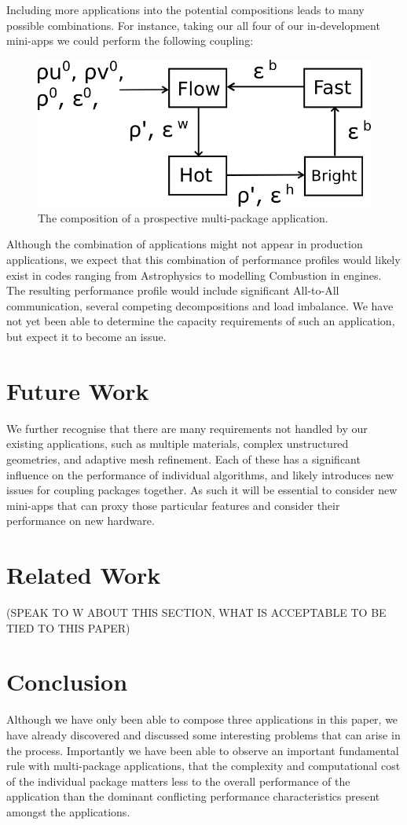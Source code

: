 \documentclass[runningheads,a4paper]{llncs}
\begin{document}
Including more applications into the potential compositions leads to many possible combinations. For instance, taking our all four of our in-development mini-apps we could perform the following coupling:

\begin{figure}
  \centering
  \includegraphics[width=0.6\linewidth]{all-four-flow}
  \caption{The composition of a prospective multi-package application.}
  \label{fig:multi-package-flow}
\end{figure}

Although the combination of applications might not appear in production applications, we expect that this combination of performance profiles would likely exist in codes ranging from Astrophysics to modelling Combustion in engines. The resulting performance profile would include significant All-to-All communication, several competing decompositions and load imbalance. We have not yet been able to determine the capacity requirements of such an application, but expect it to become an issue.

\section{Future Work}

We further recognise that there are many requirements not handled by our existing applications, such as multiple materials, complex unstructured geometries, and adaptive mesh refinement. Each of these has a significant influence on the performance of individual algorithms, and likely introduces new issues for coupling packages together. As such it will be essential to consider new mini-apps that can proxy those particular features and consider their performance on new hardware.

\section{Related Work}

(SPEAK TO W ABOUT THIS SECTION, WHAT IS ACCEPTABLE TO BE TIED TO THIS PAPER)

\section{Conclusion}

Although we have only been able to compose three applications in this paper, we have already discovered and discussed some interesting problems that can arise in the process. Importantly we have been able to observe an important fundamental rule with multi-package applications, that the complexity and computational cost of the individual package matters less to the overall performance of the application than the dominant conflicting performance characteristics present amongst the applications.



\end{document}
